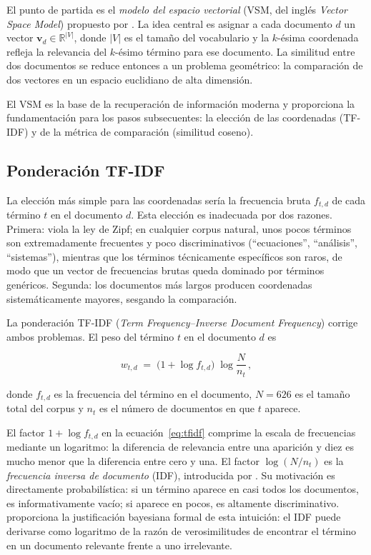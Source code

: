 \documentclass[11pt,a4paper]{article}
\begin{document}
El punto de partida es el \textit{modelo del espacio vectorial} (VSM, del inglés \textit{Vector Space Model}) propuesto por \citet{Salton1983}.
La idea central es asignar a cada documento $d$ un vector $\mathbf{v}_d \in \mathbb{R}^{|V|}$, donde $|V|$ es el tamaño del vocabulario y la $k$-ésima coordenada refleja la relevancia del $k$-ésimo término para ese documento.
La similitud entre dos documentos se reduce entonces a un problema geométrico: la comparación de dos vectores en un espacio euclidiano de alta dimensión.

El VSM es la base de la recuperación de información moderna \citep{Manning2008} y proporciona la fundamentación para los pasos subsecuentes: la elección de las coordenadas (TF-IDF) y de la métrica de comparación (similitud coseno).

\subsection{Ponderación TF-IDF}

La elección más simple para las coordenadas sería la frecuencia bruta $f_{t,d}$ de cada término $t$ en el documento $d$.
Esta elección es inadecuada por dos razones.
Primera: viola la ley de Zipf; en cualquier corpus natural, unos pocos términos son extremadamente frecuentes y poco discriminativos (``ecuaciones'', ``análisis'', ``sistemas''), mientras que los términos técnicamente específicos son raros, de modo que un vector de frecuencias brutas queda dominado por términos genéricos.
Segunda: los documentos más largos producen coordenadas sistemáticamente mayores, sesgando la comparación.

La ponderación TF-IDF (\textit{Term Frequency--Inverse Document Frequency}) corrige ambos problemas.
El peso del término $t$ en el documento $d$ es \citep{Salton1988}

\begin{equation}
  w_{t,d} \;=\; \bigl(1 + \log f_{t,d}\bigr)\;\log\frac{N}{n_t}\,,
  \label{eq:tfidf}
\end{equation}

donde $f_{t,d}$ es la frecuencia del término en el documento, $N = 626$ es el tamaño total del corpus y $n_t$ es el número de documentos en que $t$ aparece.

El factor $1 + \log f_{t,d}$ en la ecuación~\eqref{eq:tfidf} comprime la escala de frecuencias mediante un logaritmo: la diferencia de relevancia entre una aparición y diez es mucho menor que la diferencia entre cero y una.
El factor $\log(N/n_t)$ es la \textit{frecuencia inversa de documento} (IDF), introducida por \citet{SparkJones1972}.
Su motivación es directamente probabilística: si un término aparece en casi todos los documentos, es informativamente vacío; si aparece en pocos, es altamente discriminativo.
\citet{Robertson2004} proporciona la justificación bayesiana formal de esta intuición: el IDF puede derivarse como logaritmo de la razón de verosimilitudes de encontrar el término en un documento relevante frente a uno irrelevante.
\end{document}
